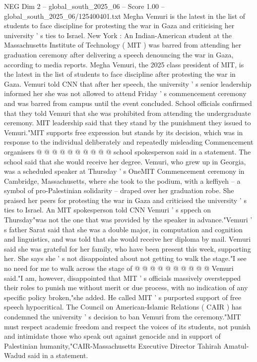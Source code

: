 \begin{textsample}{NEG Dim 2 – global\_south\_2025\_06 – Score 1.00 – global\_south\_2025\_06/125400401.txt}  \label{ex:f2_neg_359}
Megha Vemuri is the latest in the list of students to face discipline for protesting the war in Gaza and criticising her university ' s ties to Israel.
New York : An Indian-American student at the Massachusetts Institute of Technology ( MIT ) was barred from attending her graduation ceremony after delivering a speech denouncing the war in Gaza, according to media reports.
Megha Vemuri, the 2025 class president of MIT, is the latest in the list of students to face discipline after protesting the war in Gaza.
Vemuri told CNN that after her speech, the university ' s senior leadership informed her she was not allowed to attend Friday ' s commencement ceremony and was barred from campus until the event concluded.
School officials confirmed that they told Vemuri that she was prohibited from attending the undergraduate ceremony.
MIT leadership said that they stand by the punishment they issued to Vemuri."MIT supports free expression but stands by its decision, which was in response to the individual deliberately and repeatedly misleading Commencement organisers @ @ @ @ @ @ @ @ @ @ school spokesperson said in a statement.
The school said that she would receive her degree.
Vemuri, who grew up in Georgia, was a scheduled speaker at Thursday ' s OneMIT Commencement ceremony in Cambridge, Massachusetts, where she took to the podium, with a keffiyeh -- a symbol of pro-Palestinian solidarity -- draped over her graduation robe.
She praised her peers for protesting the war in Gaza and criticised the university ' s ties to Israel.
An MIT spokesperson told CNN Vemuri ' s sppech on Thursday"was not the one that was provided by the speaker in advance."Vemuri ' s father Sarat said that she was a double major, in computation and cognition and linguistics, and was told that she would receive her diploma by mail.
Vemuri said she was grateful for her family, who have been present this week, supporting her.
She says she ' s not disappointed about not getting to walk the stage."I see no need for me to walk across the stage of @ @ @ @ @ @ @ @ @ @ Vemuri said."I am, however, disappointed that MIT ' s officials massively overstepped their roles to punish me without merit or due process, with no indication of any specific policy broken,"she added.
He called MIT ' s purported support of free speech hypocritical.
The Council on American-Islamic Relations ( CAIR ) has condemned the university ' s decision to ban Vemuri from the ceremony."MIT must respect academic freedom and respect the voices of its students, not punish and intimidate those who speak out against genocide and in support of Palestinian humanity,"CAIR-Massachusetts Executive Director Tahirah Amatul-Wadud said in a statement.

\end{textsample}
